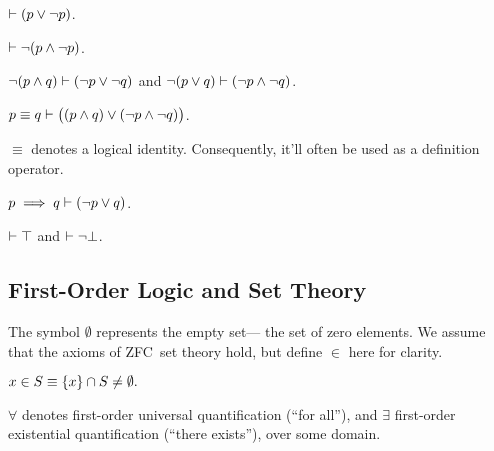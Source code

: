 \begin{definition}
  $\vdash (p \vee \neg p)$.
\end{definition}

\begin{definition}
  $\vdash \neg(p \wedge \neg p)$.
\end{definition}

\begin{definition}
  $\neg(p \wedge q) \vdash (\neg p \vee \neg q)$
    and $\neg(p \vee q) \vdash (\neg p \wedge \neg q)$.
\end{definition}

\indexsym{}
\begin{definition}
  $p\equiv q \vdash \big((p \wedge q) \vee (\neg p \wedge \neg q)\big)$.
\end{definition}

$\equiv$ denotes a logical identity.
Consequently,
  it'll often be used as a definition operator.

\begin{definition}
  $p\implies q \vdash (\neg p \vee q)$.
\end{definition}

\begin{definition}
  $\vdash\top$ and $\vdash\neg\bot$.
\end{definition}


\subsection{First-Order Logic and Set Theory}
The symbol $\emptyset$ represents the empty set---%
  the set of zero elements.
We assume that the axioms of ZFC~set theory hold,
  but define $\in$ here for clarity.

\indexsym{}
\begin{definition}
  $x \in S \equiv \left\{x\right\} \cap S \not= \emptyset.$
\end{definition}

\indexsym{}
\indexsym{}
$\forall$ denotes first-order universal quantification (``for all''),
  and $\exists$ first-order existential quantification (``there exists''),
  over some domain.

